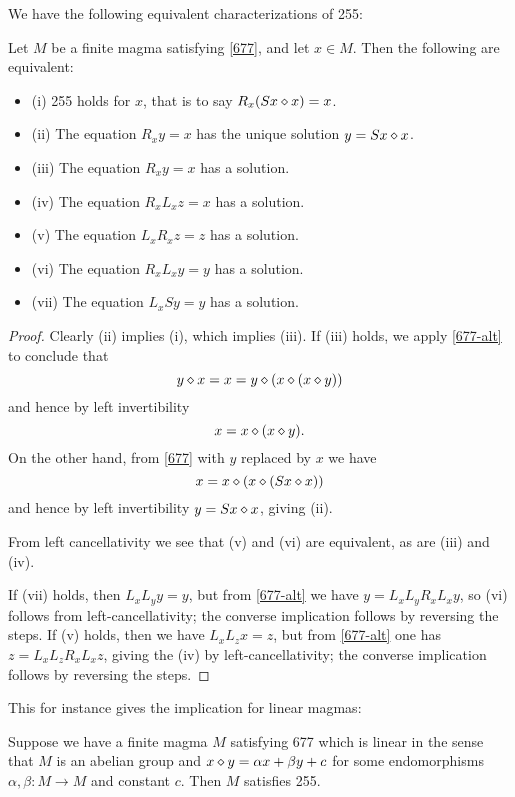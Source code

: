 We have the following equivalent characterizations of 255:

\begin{lemma}\label{255-equiv} Let $M$ be a finite magma satisfying \eqref{677}, and let $x \in M$.  Then the following are equivalent:
\begin{itemize}
  \item (i)  255 holds for $x$, that is to say $R_x (Sx \diamond x) = x$.
  \item (ii) The equation $R_x y = x$ has the unique solution $y = Sx \diamond x$.
  \item (iii) The equation $R_x y = x$ has a solution.
  \item (iv) The equation $R_x L_x z = x$ has a solution.
  \item (v) The equation $L_x R_x z = z$ has a solution.
  \item (vi) The equation $R_x L_x y = y$ has a solution.
  \item (vii) The equation $L_x S y = y$ has a solution.
\end{itemize}
\end{lemma}

\begin{proof} Clearly (ii) implies (i), which implies (iii).  If (iii) holds,
  we apply \eqref{677-alt} to conclude that
  $$ y \diamond x = x = y \diamond (x \diamond (x \diamond y))$$
  and hence by left invertibility
  $$ x = x \diamond (x \diamond y).$$
  On the other hand, from \eqref{677} with $y$ replaced by $x$ we have
  $$ x = x \diamond (x \diamond (Sx \diamond x))$$
 and hence by left invertibility $y = Sx \diamond x$, giving (ii).

From left cancellativity we see that (v) and (vi) are equivalent, as are (iii) and (iv).

If (vii) holds, then $L_x L_y y = y$, but from \eqref{677-alt} we have $y = L_x L_y R_x L_x y$, so (vi) follows from left-cancellativity; the converse implication follows by reversing the steps.  If (v) holds, then we have $L_x L_z x = z$, but from \eqref{677-alt} one has $z = L_x L_z R_x L_x z$, giving the (iv) by left-cancellativity; the converse implication follows by reversing the steps.
\end{proof}


This for instance gives the implication for linear magmas:

\begin{lemma}\label{linear-obstruction}  Suppose we have a finite magma $M$ satisfying 677 which is linear in the sense that $M$ is an abelian group and $x \diamond y = \alpha x + \beta y + c$ for some endomorphisms $\alpha,\beta: M \to M$ and constant $c$.  Then $M$ satisfies 255.
\end{lemma}

